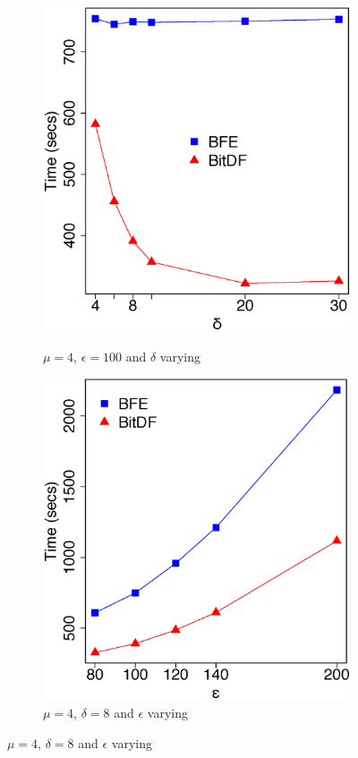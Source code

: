 {\begin{figure}[h!]
    \centering
    \caption{Results varying $\delta$ and $\epsilon$ for BerlinMOD dataset}
    \begin{subfigure}[t]{0.48\textwidth}
        \caption{$\mu = 4$, $\epsilon = 100$ and $\delta$ varying}
        \includegraphics[width=\textwidth]{images/BerlinMOD_n_4_g_100_varying_l.eps}
        \label{fig:berlinmod_vary_l}
    \end{subfigure}
    \begin{subfigure}[t]{0.48\textwidth}
        \caption{$\mu = 4$, $\delta = 8$ and $\epsilon$ varying}
        \includegraphics[width=\textwidth]{images/BerlinMOD_n_4_l_8_varying_g.eps}

\end{subfigure}
\end{figure}}

